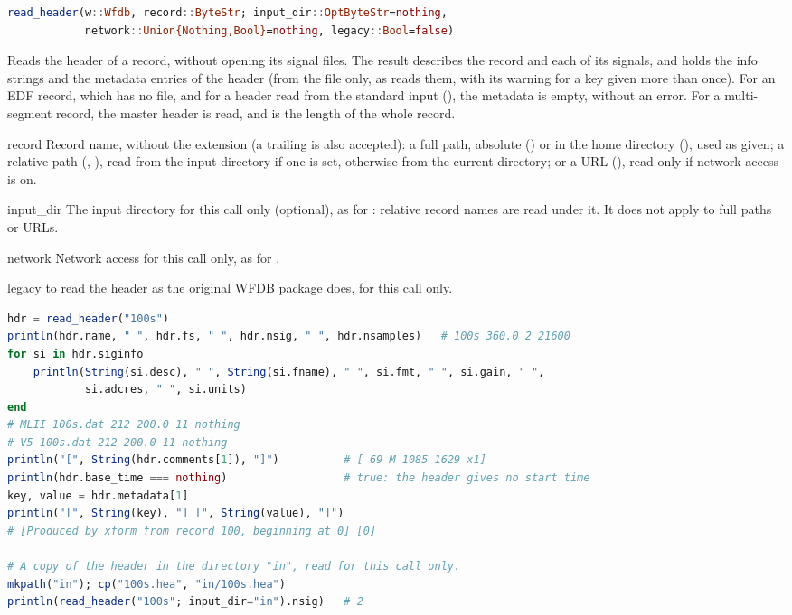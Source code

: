 \begin{lstlisting}[language=Julia,style=signature]
read_header(w::Wfdb, record::ByteStr; input_dir::OptByteStr=nothing,
            network::Union{Nothing,Bool}=nothing, legacy::Bool=false)
\end{lstlisting}
Reads the header of a record, without opening its signal files. The result describes the
record and each of its signals, and holds the info strings and the metadata entries of the
header (from the  file only, as  reads them, with its
warning for a key given more than once). For an EDF record, which has no 
file, and for a header read from the standard input (), the metadata is empty,
without an error. For a multi-segment record, the master header is read, and
 is the length of the whole record.
\begin{params}
\item[record] Record name, without the  extension (a trailing  is
  also accepted): a full path, absolute () or in the home
  directory (), used as given; a relative path
  (, ), read from the input directory if one is set,
  otherwise from the current directory; or a URL
  (), read only if network access is
  on.
\item[input\_dir] The input directory for this call only (optional), as for
  : relative record names are read under it. It does not apply to full
  paths or URLs.
\item[network] Network access for this call only, as for .
\item[legacy]  to read the header as the original WFDB package does, for this
  call only.
\end{params}
\begin{lstlisting}[language=Julia,style=example]
hdr = read_header("100s")
println(hdr.name, " ", hdr.fs, " ", hdr.nsig, " ", hdr.nsamples)   # 100s 360.0 2 21600
for si in hdr.siginfo
    println(String(si.desc), " ", String(si.fname), " ", si.fmt, " ", si.gain, " ",
            si.adcres, " ", si.units)
end
# MLII 100s.dat 212 200.0 11 nothing
# V5 100s.dat 212 200.0 11 nothing
println("[", String(hdr.comments[1]), "]")          # [ 69 M 1085 1629 x1]
println(hdr.base_time === nothing)                  # true: the header gives no start time
key, value = hdr.metadata[1]
println("[", String(key), "] [", String(value), "]")
# [Produced by xform from record 100, beginning at 0] [0]

# A copy of the header in the directory "in", read for this call only.
mkpath("in"); cp("100s.hea", "in/100s.hea")
println(read_header("100s"; input_dir="in").nsig)   # 2
\end{lstlisting}

